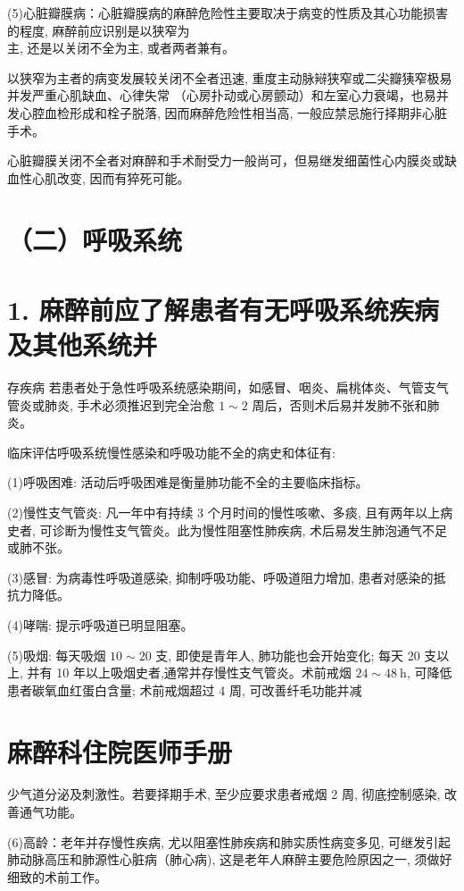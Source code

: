 \documentclass[10pt]{article}
\begin{document}
(5)心脏瓣膜病：心脏瓣膜病的麻醉危险性主要取决于病变的性质及其心功能损害的程度, 麻醉前应识别是以狭窄为\\
主, 还是以关闭不全为主, 或者两者兼有。

以狭窄为主者的病变发展较关闭不全者迅速, 重度主动脉㦚狭窄或二尖瓣㹫窄极易并发严重心肌缺血、心律失常 （心房扑动或心房颤动）和左室心力衰竭，也易并发心腔血检形成和栓子脱落, 因而麻醉危险性相当高, 一般应禁忌施行择期非心脏手术。

心脏瓣膜关闭不全者对麻醉和手术耐受力一般尚可，但易继发细菌性心内膜炎或缺血性心肌改变, 因而有猝死可能。

\section*{（二）呼吸系统}
\section*{1. 麻醉前应了解患者有无呼吸系统疾病及其他系统并}
存疾病 若患者处于急性呼吸系统感染期间，如感冒、咽炎、扁桃体炎、气管支气管炎或肺炎, 手术必须推迟到完全治愈 $1 \sim 2$ 周后，否则术后易并发肺不张和肺炎。

临床评估呼吸系统慢性感染和呼吸功能不全的病史和体征有:

(1)呼吸困难: 活动后呼吸困难是衡量肺功能不全的主要临床指标。

(2)慢性支气管炎: 凡一年中有持续 3 个月时间的慢性咳嗽、多痰, 且有两年以上病史者, 可诊断为慢性支气管炎。此为慢性阻塞性肺疾病, 术后易发生肺泡通气不足或肺不张。

(3)感冒: 为病毒性呼吸道感染, 抑制呼吸功能、呼吸道阻力增加, 患者对感染的抵抗力降低。

(4)哮喘: 提示呼吸道已明显阻塞。

(5)吸烟: 每天吸烟 $10 \sim 20$ 支, 即使是青年人, 肺功能也会开始变化; 每天 20 支以上, 并有 10 年以上吸烟史者,通常并存慢性支气管炎。术前戒烟 $24 \sim 48 \mathrm{~h}$, 可降低患者碳氧血红蛋白含量; 术前戒烟超过 4 周, 可改善纤毛功能并减

\section*{麻醉科住院医师手册}
少气道分泌及刺激性。若要择期手术, 至少应要求患者戒烟 2 周, 彻底控制感染, 改善通气功能。

(6)高龄：老年并存慢性疾病, 尤以阻塞性肺疾病和肺实质性病变多见, 可继发引起肺动脉高压和肺源性心脏病（肺心病), 这是老年人麻醉主要危险原因之一, 须做好细致的术前工作。
\end{document}
